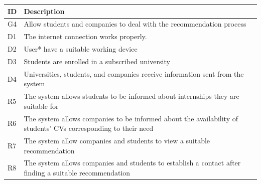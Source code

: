 \begin{center}
    \begin{longtable}{|l|p{13.5cm}|}
        \hline
        \rowcolor[HTML]{5C8A99}
        \textbf{ID} & \textbf{Description} \\ \hline
        \rowcolor[HTML]{E7E0FA} %
        G4 & Allow students and companies to deal with the recommendation process \\ \hline
        \rowcolor[HTML]{FFF9C4} %
        D1 & The internet connection works properly. \\ \hline
        \rowcolor[HTML]{FFF9C4} %
        D2 & User* have a suitable working device \\ \hline
        \rowcolor[HTML]{FFF9C4} %
        D3 & Students are enrolled in a subscribed university \\ \hline
        \rowcolor[HTML]{FFF9C4} %
        D4 & Universities, students, and companies receive information sent from the system \\ \hline
        \hline\rowcolor[HTML]{FFDAB9} %
        R5 & The system allows students to be informed about internships they are suitable for \\ \hline
        \hline\rowcolor[HTML]{FFDAB9} %
        R6 &The system allows companies to be informed about the availability of students’ CVs corresponding to their need \\ \hline
        \hline\rowcolor[HTML]{FFDAB9} %
        R7 & The system allow companies and students to view a suitable recommendation \\ \hline
        \hline\rowcolor[HTML]{FFDAB9} %
        R8 & The system allows companies and students to establish a contact after finding a suitable recommendation \\ \hline
    \end{longtable}
\end{center}

